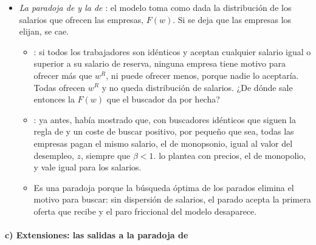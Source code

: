 \documentclass[11pt]{article}
\begin{document}
\begin{itemize}
\item \emph{La paradoja de  y la de }: el modelo toma como dada la distribución de los salarios que ofrecen las empresas, $F(w)$. Si se deja que las empresas los elijan, se cae.
  \begin{itemize}
  \item {}\nocite{Rothschild1973Models}: si todos los trabajadores son idénticos y aceptan cualquier salario igual o superior a su salario de reserva, ninguna empresa tiene motivo para ofrecer más que $w^R$, ni puede ofrecer menos, porque nadie lo aceptaría. Todas ofrecen $w^R$ y no queda distribución de salarios. ¿De dónde sale entonces la $F(w)$ que el buscador da por hecha?
  \item {}\nocite{Diamond1971Model}: ya antes,  había mostrado que, con buscadores idénticos que siguen la regla de  y un coste de buscar positivo, por pequeño que sea, todas las empresas pagan el mismo salario, el de monopsonio, igual al valor del desempleo, $z$, siempre que $\beta<1$.  lo plantea con precios, el de monopolio, y vale igual para los salarios.
  \item Es una paradoja porque la búsqueda óptima de los parados elimina el motivo para buscar: sin dispersión de salarios, el parado acepta la primera oferta que recibe y el paro friccional del modelo desaparece.
  \end{itemize}
\end{itemize}

\paragraph{c) Extensiones: las salidas a la paradoja de }
\end{document}
